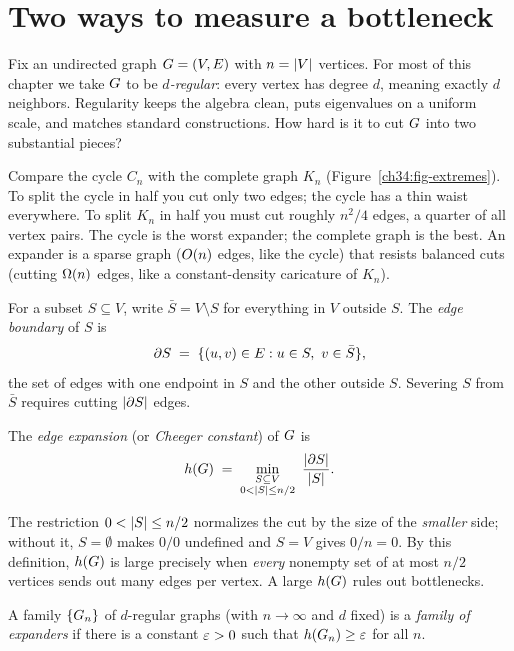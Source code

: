 \chapterline

\section{Two ways to measure a bottleneck}
\label{ch34:two-measures}

Fix an undirected graph $G=(V,E)$ with $n=\lvert V\rvert$ vertices. For most of this chapter we take $G$ to be \emph{$d$-regular}: every vertex has degree $d$, meaning exactly $d$ neighbors. Regularity keeps the algebra clean, puts eigenvalues on a uniform scale, and matches standard constructions. How hard is it to cut $G$ into two substantial pieces?

\begin{intuitionbox}
Compare the cycle $C_n$ with the complete graph $K_n$ (Figure~\ref{ch34:fig-extremes}). To split the cycle in half you cut only two edges; the cycle has a thin waist everywhere. To split $K_n$ in half you must cut roughly $n^2/4$ edges, a quarter of all vertex pairs. The cycle is the worst expander; the complete graph is the best. An expander is a sparse graph ($O(n)$ edges, like the cycle) that resists balanced cuts (cutting $\Omega(n)$ edges, like a constant-density caricature of $K_n$).
\end{intuitionbox}

For a subset $S\subseteq V$, write $\bar S = V\setminus S$ for everything in $V$ outside $S$. The \emph{edge boundary} of $S$ is
\[
  \partial S \;=\; \{(u,v)\in E : u\in S,\ v\in\bar S\},
\]
the set of edges with one endpoint in $S$ and the other outside $S$. Severing $S$ from $\bar S$ requires cutting $\lvert\partial S\rvert$ edges.

\begin{definition}
\label{ch34:def-edge-expansion}
The \emph{edge expansion} (or \emph{Cheeger constant}) of $G$ is
\[
  h(G)\;=\;\min_{\substack{S\subseteq V\\ 0<\lvert S\rvert\le n/2}}\ \frac{\lvert\partial S\rvert}{\lvert S\rvert}.
\]
\end{definition}

The restriction $0 < \lvert S\rvert\le n/2$ normalizes the cut by the size of the \emph{smaller} side; without it, $S = \emptyset$ makes $0/0$ undefined and $S = V$ gives $0/n = 0$. By this definition, $h(G)$ is large precisely when \emph{every} nonempty set of at most $n/2$ vertices sends out many edges per vertex. A large $h(G)$ rules out bottlenecks.

\begin{definition}
\label{ch34:def-expander}
A family $\{G_n\}$ of $d$-regular graphs (with $n\to\infty$ and $d$ fixed) is a \emph{family of expanders} if there is a constant $\varepsilon>0$ such that $h(G_n)\ge \varepsilon$ for all $n$.
\end{definition}

